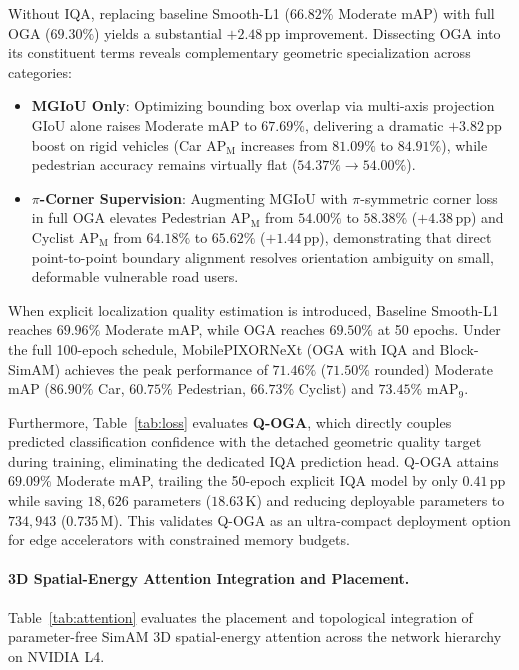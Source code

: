 Without IQA, replacing baseline Smooth-L1 ($66.82\%$ Moderate mAP) with full OGA ($69.30\%$) yields a substantial $+2.48\,\text{pp}$ improvement. Dissecting OGA into its constituent terms reveals complementary geometric specialization across categories:
\begin{itemize}
    \item \textbf{MGIoU Only}: Optimizing bounding box overlap via multi-axis projection GIoU alone raises Moderate mAP to $67.69\%$, delivering a dramatic $+3.82\,\text{pp}$ boost on rigid vehicles (Car AP$_{\mathrm{M}}$ increases from $81.09\%$ to $84.91\%$), while pedestrian accuracy remains virtually flat ($54.37\% \to 54.00\%$).
    \item \textbf{$\pi$-Corner Supervision}: Augmenting MGIoU with $\pi$-symmetric corner loss in full OGA elevates Pedestrian AP$_{\mathrm{M}}$ from $54.00\%$ to $58.38\%$ ($+4.38\,\text{pp}$) and Cyclist AP$_{\mathrm{M}}$ from $64.18\%$ to $65.62\%$ ($+1.44\,\text{pp}$), demonstrating that direct point-to-point boundary alignment resolves orientation ambiguity on small, deformable vulnerable road users.
\end{itemize}

When explicit localization quality estimation is introduced, Baseline Smooth-L1 reaches $69.96\%$ Moderate mAP, while OGA reaches $69.50\%$ at 50 epochs. Under the full 100-epoch schedule, MobilePIXORNeXt (OGA with IQA and Block-SimAM) achieves the peak performance of $71.46\%$ ($71.50\%$ rounded) Moderate mAP ($86.90\%$ Car, $60.75\%$ Pedestrian, $66.73\%$ Cyclist) and $73.45\%$ $\text{mAP}_9$.

Furthermore, Table~\ref{tab:loss} evaluates \textbf{Q-OGA}, which directly couples predicted classification confidence with the detached geometric quality target during training, eliminating the dedicated IQA prediction head. Q-OGA attains $69.09\%$ Moderate mAP, trailing the 50-epoch explicit IQA model by only $0.41\,\text{pp}$ while saving $18{,}626$ parameters ($18.63\,\text{K}$) and reducing deployable parameters to $734{,}943$ ($0.735\,\text{M}$). This validates Q-OGA as an ultra-compact deployment option for edge accelerators with constrained memory budgets.

\paragraph{3D Spatial-Energy Attention Integration and Placement.}
Table~\ref{tab:attention} evaluates the placement and topological integration of parameter-free SimAM 3D spatial-energy attention across the network hierarchy on NVIDIA L4.

